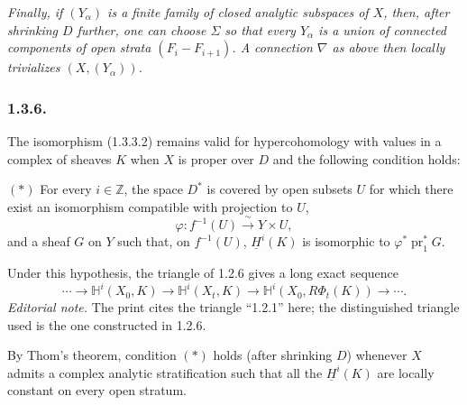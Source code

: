 \textit{Finally, if $(Y_\alpha)$ is a finite family of closed
analytic subspaces of $X$, then, after shrinking $D$ further, one can
choose $\Sigma$ so that every $Y_\alpha$ is a union of connected
components of open strata $(F_i-F_{i+1})$.  A connection $\nabla$ as
above then locally trivializes $(X,(Y_\alpha))$.}

\subsubsection*{1.3.6.}
The isomorphism (1.3.3.2) remains valid for hypercohomology with
values in a complex of sheaves $K$ when $X$ is proper over $D$ and
the following condition holds:

\medskip
\noindent $(*)$ For every $i\in\mathbb Z$, the space $D^*$ is
covered by open subsets $U$ for which there exist an isomorphism
compatible with projection to $U$,
\[
\varphi:f^{-1}(U)\xrightarrow{\ \sim\ }Y\times U,
\]
and a sheaf $G$ on $Y$ such that, on $f^{-1}(U)$,
$\underline H^i(K)$ is isomorphic to $\varphi^*\operatorname{pr}_1^*G$.

Under this hypothesis, the triangle of 1.2.6 gives a long exact
sequence
\begin{equation}\tag{1.3.6.1}
\cdots\longrightarrow
\mathbb H^i(X_0,K)\longrightarrow
\mathbb H^i(X_t,K)\longrightarrow
\mathbb H^i(X_0,R\Phi_t(K))\longrightarrow\cdots.
\end{equation}
\noindent\emph{Editorial note.}  The print cites the triangle
``1.2.1'' here; the distinguished triangle used is the one constructed
in 1.2.6.

By Thom's theorem, condition $(*)$ holds (after shrinking $D$) whenever
$X$ admits a complex analytic stratification such that all the
$\underline H^i(K)$ are locally constant on every open stratum.


